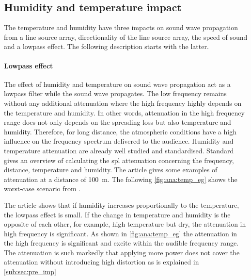 \subsection{Humidity and temperature impact}\label{sec:ana:hu_temp}
The temperature and humidity have three impacts on sound wave propagation from a line source array, directionality of the line source array, the speed of sound and a lowpass effect. The following description starts with the latter. 

\paragraph{Lowpass effect} The effect of humidity and temperature on sound wave propagation act as a lowpass filter while the sound wave propagates. The low frequency remains without any additional attenuation where the high frequency highly depends on the temperature and humidity. In other words, attenuation in the high frequency range does not only depends on the spreading loss but also temperature and humidity. Therefore, for long distance, the atmospheric conditions have a high influence on the frequency spectrum delivered to the audience. Humidity and temperature attenuation are already well studied and standardised. Standard \citep{iso_9613-1} gives an overview of calculating the \gls{spl}  attenuation concerning the frequency, distance, temperature and humidity. The article \citep{corteel2017large} gives some examples of attenuation at a distance of \SI{100}{\meter}.  The following \autoref{fig:ana:temp_eg} shows the worst-case scenario from \citep{corteel2017large}.

The article shows that if humidity increases proportionally to the temperature, the lowpass effect is small. If the change in temperature and humidity is the opposite of each other, for example, high temperature but dry, the attenuation in high frequency is significant. As shown in \autoref{fig:ana:temp_eg} the attenuation in the high frequency is significant and excite  within the audible frequency range. The attenuation is such markedly that applying more power does not cover the attenuation without introducing high distortion as is explained in \autoref{sub:sec:pre_imp}


